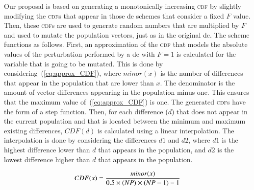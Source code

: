 \documentclass[preprint,3p]{elsarticle}
\newcommand{\DE}{{\sc de}}
\begin{document}
%
%
%
%
%
%
Our proposal is based on generating a monotonically increasing \textsc{cdf} %
by slightly modifying the \textsc{cdf}s that appear in those \DE{} schemes that consider a fixed $F$ value.
%
Then, these \textsc{cdf}s are used to generate random numbers that are multiplied
by $F$ and used to mutate the population vectors, just as in the original \DE{}.
%
The scheme functions as follows.
%
First, an approximation of the \textsc{cdf} that models the absolute values
of the perturbation performed by a \DE{} with $F = 1$ is calculated for the variable that is going to be mutated.
%
This is done by considering~(\ref{eq:approx_CDF}), where $minor(x)$ is the number of differences that appear in
the population that are lower than $x$.
%
The denominator is the amount of vector differences appearing in the population minus one.
%
This ensures that the maximum value of~(\ref{eq:approx_CDF}) is one.
%
The generated \textsc{cdf}s have the form of a step function.
%
Then, for each difference ($d$) that does not appear in the current population and that is located between the minimum and maximum
existing differences, $CDF(d)$ is calculated using a linear interpolation.
%
The interpolation is done by considering the differences $d1$ and $d2$, where $d1$ is the highest
difference lower than $d$ that appears in the population, and $d2$ is the lowest difference higher than $d$ that appears in the population.

\begin{equation}
	\label{eq:approx_CDF}
		CDF(x) = {{minor(x)}\over{0.5 \times (NP) \times (NP-1) - 1}}
\end{equation}
\end{document}
